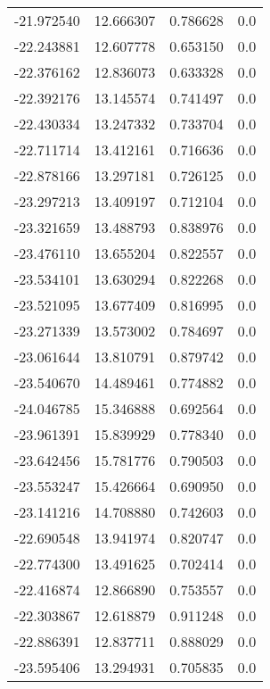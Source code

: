 \begin{tabular}{rrrr}
      -21.972540 &        12.666307 &    0.786628 &   0.0 \\
      -22.243881 &        12.607778 &    0.653150 &   0.0 \\
      -22.376162 &        12.836073 &    0.633328 &   0.0 \\
      -22.392176 &        13.145574 &    0.741497 &   0.0 \\
      -22.430334 &        13.247332 &    0.733704 &   0.0 \\
      -22.711714 &        13.412161 &    0.716636 &   0.0 \\
      -22.878166 &        13.297181 &    0.726125 &   0.0 \\
      -23.297213 &        13.409197 &    0.712104 &   0.0 \\
      -23.321659 &        13.488793 &    0.838976 &   0.0 \\
      -23.476110 &        13.655204 &    0.822557 &   0.0 \\
      -23.534101 &        13.630294 &    0.822268 &   0.0 \\
      -23.521095 &        13.677409 &    0.816995 &   0.0 \\
      -23.271339 &        13.573002 &    0.784697 &   0.0 \\
      -23.061644 &        13.810791 &    0.879742 &   0.0 \\
      -23.540670 &        14.489461 &    0.774882 &   0.0 \\
      -24.046785 &        15.346888 &    0.692564 &   0.0 \\
      -23.961391 &        15.839929 &    0.778340 &   0.0 \\
      -23.642456 &        15.781776 &    0.790503 &   0.0 \\
      -23.553247 &        15.426664 &    0.690950 &   0.0 \\
      -23.141216 &        14.708880 &    0.742603 &   0.0 \\
      -22.690548 &        13.941974 &    0.820747 &   0.0 \\
      -22.774300 &        13.491625 &    0.702414 &   0.0 \\
      -22.416874 &        12.866890 &    0.753557 &   0.0 \\
      -22.303867 &        12.618879 &    0.911248 &   0.0 \\
      -22.886391 &        12.837711 &    0.888029 &   0.0 \\
      -23.595406 &        13.294931 &    0.705835 &   0.0 \\

\end{tabular}
